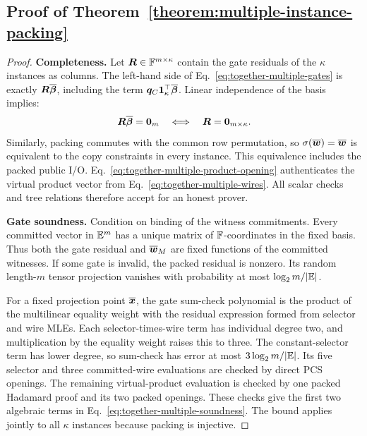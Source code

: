\subsection{Proof of Theorem~\ref{theorem:multiple-instance-packing}}
\label{appx:proof-multiple-instance}

\begin{proof}
\noindent\textbf{Completeness.}
Let \(\bm R\in{\mathbb{F}}^{m\times\kappa}\) contain the gate
residuals of the \(\kappa\) instances as columns.
The left-hand side of Eq.~\eqref{eq:together-multiple-gates}
is exactly \(\bm R\overline{\bm\beta}\), including the term
\(\bm q_C\bm1_\kappa^\top\overline{\bm\beta}\).
Linear independence of the basis implies:
\[
    \bm R\overline{\bm\beta}=\bm0_m
       \quad\Longleftrightarrow\quad
    \bm R=\bm0_{m\times\kappa}.
\]
Similarly, packing commutes with the common row permutation,
so \(\sigma(\overline{\bm w})=\overline{\bm w}\) is equivalent to
the copy constraints in every instance.
This equivalence includes the packed public I/O.
Eq.~\eqref{eq:together-multiple-product-opening} authenticates
the virtual product vector from
Eq.~\eqref{eq:together-multiple-wires}.
All scalar checks and tree relations therefore accept for an
honest prover.

\smallskip\noindent\textbf{Gate soundness.}
Condition on binding of the witness commitments.
Every committed vector in \(\mathbb{E}^m\) has a unique
matrix of \({\mathbb{F}}\)-coordinates in the fixed basis.
Thus both the gate residual and \(\overline{\bm w}_M\) are fixed
functions of the committed witnesses.
If some gate is invalid, the packed residual is nonzero.
Its random length-\(m\) tensor projection vanishes with
probability at most \(\log_2m/|\mathbb{E}|\).

For a fixed projection point \(\overline{\bm x}\), the gate
sum-check polynomial is the product of the multilinear equality
weight with the residual expression formed from selector and wire
MLEs. Each selector-times-wire term has individual degree two,
and multiplication by the equality weight raises this to three.
The constant-selector term has lower degree, so sum-check has
error at most
\(3\log_2m/|\mathbb{E}|\).
Its five selector and three committed-wire evaluations are
checked by direct PCS openings.
The remaining virtual-product evaluation is checked by one
packed Hadamard proof and its two packed openings.
These checks give the first two algebraic terms in
Eq.~\eqref{eq:together-multiple-soundness}. The bound applies
jointly to all \(\kappa\) instances because packing is injective.


\end{proof}
